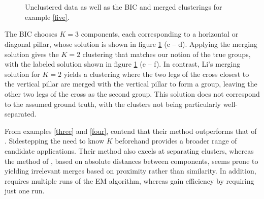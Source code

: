 \documentclass{uwstat572}
\renewcommand\;{\,}
\begin{document}
 \begin{figure}
\begin{center}
\\
\\
\end{center}
\caption{Unclustered data as well as the BIC and merged clusterings for example \ref{five}.}
\label{Example4_2}
\end{figure}

The BIC chooses $K = 3$ components, each corresponding to a horizontal or diagonal pillar, whose solution is shown in figure \ref{Example4_2} (c -- d).
Applying the merging solution gives the $K = 2$ clustering that matches our notion of the true groups, with the labeled solution shown in figure \ref{Example4_2} (e -- f).
In contrast, Li's merging solution for $K = 2$ yields a clustering where the two legs of the cross closest to the vertical pillar are merged with the vertical pillar to form a group, leaving the other two legs of the cross as the second group.
This solution does not correspond to the assumed ground truth, with the clusters not being particularly well-separated.

From examples \ref{three} and \ref{four}, \cite{Baudry10} contend that their method outperforms that of \cite{Li05}.
Sidestepping the need to know $K$ beforehand provides a broader range of candidate applications.
Their method also excels at separating clusters, whereas the method of \cite{Li05}, based on absolute distances between components, seems prone to yielding irrelevant merges based on proximity rather than similarity. 
In addition, \cite{Li05} requires multiple runs of the EM algorithm, whereas \cite{Baudry10} gain efficiency by requiring just one run.
\end{document}
